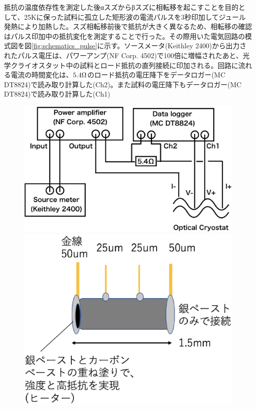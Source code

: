 抵抗の温度依存性を測定した後αスズからβスズに相転移を起こすことを目的として、25Kに保った試料に孤立した矩形波の電流パルスを3秒印加してジュール発熱により加熱した。スズ相転移前後で抵抗が大きく異なるため、相転移の確認はパルス印加中の抵抗変化を測定することで行った。その際用いた電気回路の模式図を図\ref{fig:schematics_pulse}に示す。ソースメータ(Keithley 2400)から出力されたパルス電圧は、パワーアンプ(NF Corp. 4502)で100倍に増幅されたあと、光学クライオスタット中の試料とロード抵抗の直列接続に印加される。回路に流れる電流の時間変化は、$\rm 5.4\Omega$のロード抵抗の電圧降下をデータロガー(MC DT8824)で読み取り計算した(Ch2)。また試料の電圧降下もデータロガー(MC DT8824)で読み取り計算した(Ch1)
\begin{figure}[!h]
 \begin{minipage}{0.55\hsize}
    \begin{center}
   \includegraphics[width=0.9\hsize]{experiment/schematics_pulse.eps}
  \end{center}
  \caption{}
  \label{fig:schematics_pulse}
   \end{minipage}
    \begin{minipage}{0.45\hsize}
       \begin{center}
   \includegraphics[width=0.9\hsize]{experiment/schematics_sample.eps}
  \end{center}
  \caption{}
  \label{fig:schematics_sample}
    \end{minipage}
  \end{figure}
  
